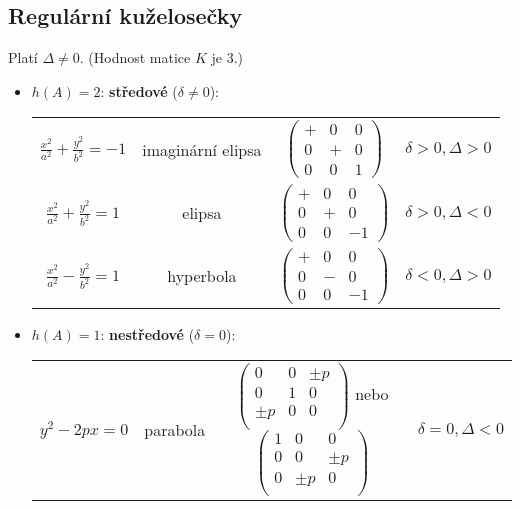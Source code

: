 \subsection*{Regulární kuželosečky}
Platí $\Delta \ne 0.$ (Hodnost matice $K$ je 3.)
\begin{itemize}
\item $h(A)=2$: \textbf{středové} ($\delta \ne 0$):
\begin{center}
    \begin{tabular}{c c c c}
        $\frac{x^2}{a^2}+\frac{y^2}{b^2}=-1$ & imaginární elipsa & $\begin{pmatrix}
            + & 0 & 0 \\
            0 & + & 0 \\
            0 & 0 & 1
        \end{pmatrix}$ & $\delta >0, \Delta >0$ \\[1cm]
        $\frac{x^2}{a^2}+\frac{y^2}{b^2}=1$ & elipsa & $\begin{pmatrix}
            + & 0 & 0 \\
            0 & + & 0 \\
            0 & 0 & -1
        \end{pmatrix}$ & $\delta >0, \Delta <0$ \\[1cm]
        $\frac{x^2}{a^2}-\frac{y^2}{b^2}=1$ & hyperbola & $\begin{pmatrix}
            + & 0 & 0 \\
            0 & - & 0 \\
            0 & 0 & -1
        \end{pmatrix}$ & $\delta <0, \Delta >0$
    \end{tabular}
\end{center}
\item $h(A)=1$: \textbf{nestředové} ($\delta = 0$):
\begin{center}
    \begin{tabular}{c c c c}
        $y^2-2px=0$ & parabola & $\begin{pmatrix}
            0 & 0 & \pm p  \\
            0 & 1 & 0 \\
            \pm p  & 0 & 0 \\
        \end{pmatrix}$ nebo $\begin{pmatrix}
            1 & 0 & 0  \\
            0 & 0 & \pm p \\
            0  & \pm p & 0 \\
        \end{pmatrix}$ & $\delta =0, \Delta <0$
    \end{tabular}
\end{center}
\end{itemize}

